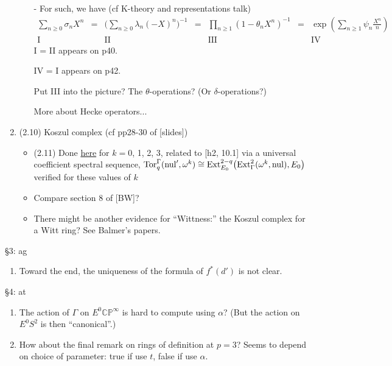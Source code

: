\documentclass{rs}
\theoremstyle{definition}
\theoremstyle{remark}
\newcommand{\mb}[1]{\mathbb{#1}}
\newcommand{\Ext}{{\rm Ext}}
\newcommand{\Tor}{{\rm Tor}}
\newcommand{\nul}{{\rm nul}}
\newcommand{\G}{\Gamma}
\renewcommand{\=}{\approx}
\renewcommand{\-}{\sim}
\numberwithin{equation}{section}
\numberwithin{thm}{section}
\begin{document}
\begin{enumerate}
\begin{itemize}
  - For such, we have (cf K-theory and representations talk) 
  \[
   \begin{array}{ccccccc}
    \sum_{n \geq 0} \sigma_n X^n & = & \big(\sum_{n \geq 0} \lambda_n (-X)^n \big)^{-1} & = & \prod_{n \geq 1} (1 - \theta_n X^n)^{-1} & = & \exp (\sum_{n \geq 1} \psi_n \frac{X^n}{n}) \\
    \text{I} && \text{II} && \text{III} && \text{IV} 
   \end{array}
  \]
  I = II appears on p40.

  IV = I appears on p42.

  Put III into the picture? The $\theta$-operations? (Or $\delta$-operations?)

  More about Hecke operators...
 \end{itemize}

 \item (2.10) Koszul complex (cf pp28-30 of [slides])
 \begin{itemize}
  \item (2.11) Done \href{http://www.math.northwestern.edu/~zyf/at/elliptic cohomology/the power operation structure on the K(1)-localization of E_2/calculations/dual.pdf}{here} for $k = 0$, 1, 2, 3, 
  related to [h2, 10.1] via a universal coefficient spectral sequence, 
  $\Tor^\G_q(\nul', \omega^k) \cong \Ext_{E_0}^{2-q} \big( \Ext_\G^2(\omega^k, \nul), E_0 \big)$ verified for these values of $k$ 

  \item Compare section 8 of [BW]?

  \item There might be another evidence for ``Wittness:'' the Koszul complex for a Witt ring? See Balmer's papers.
 \end{itemize}
\end{enumerate}

\S 3: ag
\begin{enumerate}
 \item Toward the end, the uniqueness of the formula of $f^*(d')$ is not clear.
\end{enumerate}

\S 4: at
\begin{enumerate}
 \item The action of $\Gamma$ on $E^0 \mb{CP}^\infty$ is hard to compute using $\alpha$? 
 (But the action on $E^0 S^2$ is then ``canonical''.)

 \item How about the final remark on rings of definition at $p = 3$? Seems to depend on choice of parameter: true if use $t$, false if use $\alpha$.  \\
\end{enumerate}
\end{document}
